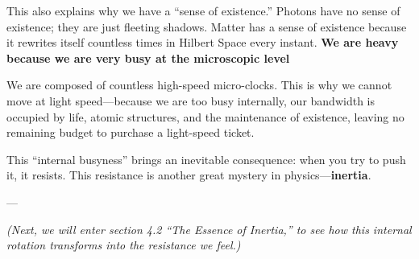 This also explains why we have a ``sense of existence.'' Photons have no sense of existence; they are just fleeting shadows. Matter has a sense of existence because it rewrites itself countless times in Hilbert Space every instant. \textbf{We are heavy because we are very busy at the microscopic level}

We are composed of countless high-speed micro-clocks. This is why we cannot move at light speed---because we are too busy internally, our bandwidth is occupied by life, atomic structures, and the maintenance of existence, leaving no remaining budget to purchase a light-speed ticket.

This ``internal busyness'' brings an inevitable consequence: when you try to push it, it resists. This resistance is another great mystery in physics---\textbf{inertia}.

---

\textit{(Next, we will enter section 4.2 ``The Essence of Inertia,'' to see how this internal rotation transforms into the resistance we feel.)}

